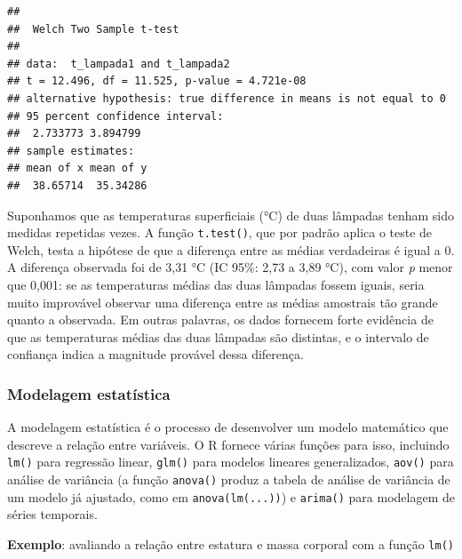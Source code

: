 \documentclass[
]{book}
\begin{document}
\begin{verbatim}
## 
##  Welch Two Sample t-test
## 
## data:  t_lampada1 and t_lampada2
## t = 12.496, df = 11.525, p-value = 4.721e-08
## alternative hypothesis: true difference in means is not equal to 0
## 95 percent confidence interval:
##  2.733773 3.894799
## sample estimates:
## mean of x mean of y 
##  38.65714  35.34286
\end{verbatim}

Suponhamos que as temperaturas superficiais (°C) de duas lâmpadas tenham sido medidas repetidas vezes. A função \texttt{t.test()}, que por padrão aplica o teste de Welch, testa a hipótese de que a diferença entre as médias verdadeiras é igual a 0. A diferença observada foi de 3,31 °C (IC 95\%: 2,73 a 3,89 °C), com valor \emph{p} menor que 0,001: se as temperaturas médias das duas lâmpadas fossem iguais, seria muito improvável observar uma diferença entre as médias amostrais tão grande quanto a observada. Em outras palavras, os dados fornecem forte evidência de que as temperaturas médias das duas lâmpadas são distintas, e o intervalo de confiança indica a magnitude provável dessa diferença.

\subsubsection{Modelagem estatística}\label{modelagem-estatuxedstica}

A modelagem estatística é o processo de desenvolver um modelo matemático que descreve a relação entre variáveis. O R fornece várias funções para isso, incluindo \texttt{lm()} para regressão linear, \texttt{glm()} para modelos lineares generalizados, \texttt{aov()} para análise de variância (a função \texttt{anova()} produz a tabela de análise de variância de um modelo já ajustado, como em \texttt{anova(lm(...))}) e \texttt{arima()} para modelagem de séries temporais.

\textbf{Exemplo}: avaliando a relação entre estatura e massa corporal com a função \texttt{lm()}
\end{document}
